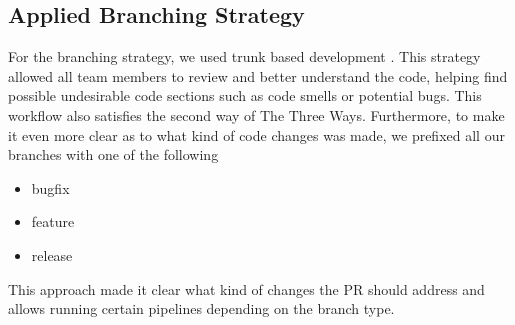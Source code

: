\subsection{Applied Branching Strategy}

For the branching strategy, we used trunk based development \cite{trunkdev}. This strategy allowed all team members to review and better understand the code, helping find possible undesirable code sections such as code smells or potential bugs. This workflow also satisfies the second way of The Three Ways.
Furthermore, to make it even more clear as to what kind of code changes was made, we prefixed all our branches with one of the following

\begin{itemize}[noitemsep]
  \item bugfix
  \item feature
  \item release
\end{itemize}
This approach made it clear what kind of changes the PR should address and allows running certain pipelines depending on the branch type.
